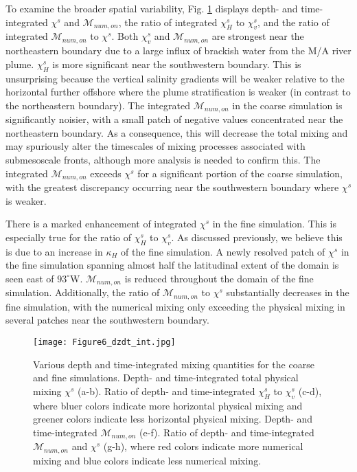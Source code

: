 \documentclass[draft]{agujournal2019}
\begin{document}
To examine the broader spatial variability, Fig. \ref{fig:depth_integrated} displays depth- and time-integrated $\chi^s$ and $\mathcal{M}_{num, on}$, the ratio of integrated $\chi_H^s$ to $\chi_v^s$, and the ratio of integrated $\mathcal{M}_{num, on}$ to $\chi^s$. Both $\chi_v^s$ and $\mathcal{M}_{num, on}$ are strongest near the northeastern boundary due to a large influx of brackish water from the M/A river plume. $\chi_H^s$ is more significant near the southwestern boundary. This is unsurprising because the vertical salinity gradients will be weaker relative to the horizontal further offshore where the plume stratification is weaker (in contrast to the northeastern boundary). The integrated $\mathcal{M}_{num, on}$ in the coarse simulation is significantly noisier, with a small patch of negative values concentrated near the northeastern boundary. As a consequence, this will decrease the total mixing and may spuriously alter the timescales of mixing processes associated with submesoscale fronts, although more analysis is needed to confirm this. The integrated $\mathcal{M}_{num, on}$ exceeds $\chi^s$ for a significant portion of the coarse simulation, with the greatest discrepancy occurring near the southwestern boundary where $\chi^s$ is weaker. 

There is a marked enhancement of integrated $\chi^s$ in the fine simulation. This is especially true for the ratio of $\chi_H^s$ to $\chi_v^s$. As discussed previously, we believe this is due to an increase in $\kappa_H$ of the fine simulation. A newly resolved patch of $\chi^s$ in the fine simulation spanning almost half the latitudinal extent of the domain is seen east of $93^{\circ}$W. $\mathcal{M}_{num, on}$ is reduced throughout the domain of the fine simulation. Additionally, the ratio of $\mathcal{M}_{num, on}$ to $\chi^s$ substantially decreases in the fine simulation, with the numerical mixing only exceeding the physical mixing in several patches near the southwestern boundary.

\begin{figure}
 \centerline{\texttt{[image: Figure6\_dzdt\_int.jpg]}}
  \caption{Various depth and time-integrated mixing quantities for the coarse and fine simulations. Depth- and time-integrated total physical mixing $\chi^s$ (a-b). Ratio of depth- and time-integrated $\chi_H^s$ to $\chi_v^s$ (c-d), where bluer colors indicate more horizontal physical mixing and greener colors indicate less horizontal physical mixing. Depth- and time-integrated $\mathcal{M}_{num, on}$ (e-f). Ratio of depth- and time-integrated $\mathcal{M}_{num,on}$ and $\chi^s$ (g-h), where red colors indicate more numerical mixing and blue colors indicate less numerical mixing.}
  \label{fig:depth_integrated}
\end{figure}
\end{document}
